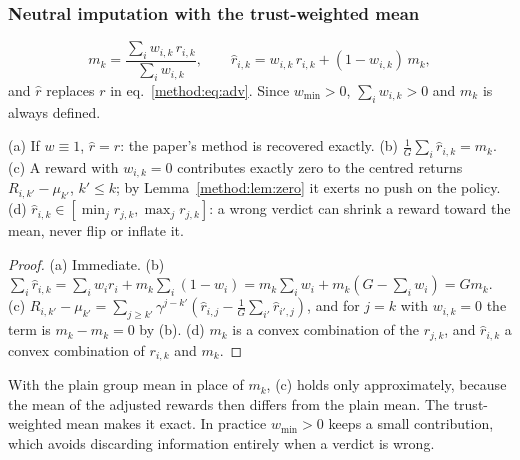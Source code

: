 \subsubsection{Neutral imputation with the trust-weighted mean}
\begin{equation}\label{method:eq:neutral}
m_k=\frac{\sum_i w_{i,k}\,r_{i,k}}{\sum_i w_{i,k}},\qquad \hat r_{i,k}=w_{i,k}\,r_{i,k}+(1-w_{i,k})\,m_k,
\end{equation}
and $\hat r$ replaces $r$ in eq.~\eqref{method:eq:adv}. Since $w_{\min}>0$, $\sum_iw_{i,k}>0$ and $m_k$ is always defined.

\begin{proposition}\label{method:prop:neutral}
(a) If $w\equiv1$, $\hat r=r$: the paper's method is recovered exactly. (b) $\tfrac1G\sum_i\hat r_{i,k}=m_k$. (c) A reward with $w_{i,k}=0$ contributes exactly zero to the centred returns $R_{i,k'}-\mu_{k'}$, $k'\le k$; by Lemma~\ref{method:lem:zero} it exerts no push on the policy. (d) $\hat r_{i,k}\in[\min_jr_{j,k},\max_jr_{j,k}]$: a wrong verdict can shrink a reward toward the mean, never flip or inflate it.
\end{proposition}
\begin{proof}
(a) Immediate. (b) $\sum_i\hat r_{i,k}=\sum_iw_ir_i+m_k\sum_i(1-w_i)=m_k\sum_iw_i+m_k(G-\sum_iw_i)=Gm_k$. (c) $R_{i,k'}-\mu_{k'}=\sum_{j\ge k'}\gamma^{j-k'}(\hat r_{i,j}-\tfrac1G\sum_{i'}\hat r_{i',j})$, and for $j=k$ with $w_{i,k}=0$ the term is $m_k-m_k=0$ by (b). (d) $m_k$ is a convex combination of the $r_{j,k}$, and $\hat r_{i,k}$ a convex combination of $r_{i,k}$ and $m_k$.
\end{proof}
\begin{remark}
With the plain group mean in place of $m_k$, (c) holds only approximately, because the mean of the adjusted rewards then differs from the plain mean. The trust-weighted mean makes it exact. In practice $w_{\min}>0$ keeps a small contribution, which avoids discarding information entirely when a verdict is wrong.
\end{remark}

